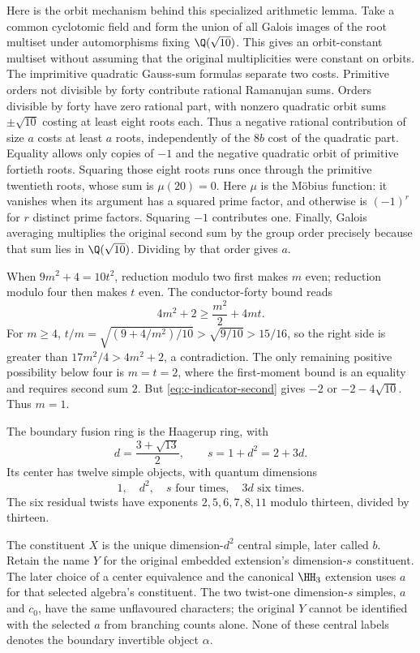 Here is the orbit mechanism behind this specialized arithmetic lemma.
Take a common cyclotomic field and form the union of all Galois images
of the root multiset under automorphisms fixing $\Q(\sqrt{10})$.
This gives an orbit-constant multiset without assuming that the
original multiplicities were constant on orbits. The imprimitive
quadratic Gauss-sum formulas separate two costs. Primitive orders
not divisible by forty contribute rational Ramanujan sums. Orders
divisible by forty have zero rational part, with nonzero quadratic
orbit sums $\pm\sqrt{10}$ costing at least eight roots each.
Thus a negative rational contribution of size $a$ costs at least
$a$ roots, independently of the $8b$ cost of the quadratic part.
Equality allows only copies of $-1$ and the negative quadratic orbit
of primitive fortieth roots. Squaring those eight roots runs once
through the primitive twentieth roots, whose sum is $\mu(20)=0$.
Here $\mu$ is the M\"obius function: it vanishes when its argument has
a squared prime factor, and otherwise is $(-1)^r$ for $r$ distinct
prime factors. Squaring $-1$ contributes one. Finally, Galois averaging
multiplies
the original second sum by the group order precisely because that
sum lies in $\Q(\sqrt{10})$. Dividing by that order gives $a$.

When $9m^2+4=10t^2$, reduction modulo two first makes $m$ even;
reduction modulo four then makes $t$ even. The conductor-forty
bound reads
\[
 4m^2+2\geq\frac{m^2}{2}+4mt.
\]
For $m\geq4$,
$t/m=\sqrt{(9+4/m^2)/10}>\sqrt{9/10}>15/16$, so the
right side is greater than $17m^2/4>4m^2+2$, a contradiction.
The only remaining positive possibility below four is $m=t=2$,
where the first-moment bound is an
equality and requires second sum $2$. But
\eqref{eq:c-indicator-second} gives $-2$ or $-2-4\sqrt{10}$.
Thus $m=1$.

\begin{proposition}
The boundary fusion ring is the Haagerup ring, with
\[
 d=\frac{3+\sqrt{13}}2,\qquad s=1+d^2=2+3d.
\]
Its center has twelve simple objects, with quantum dimensions
\[
 1,\quad d^2,\quad s\text{ four times},\quad3d\text{ six times}.
\]
The six residual twists have exponents
$2,5,6,7,8,11$ modulo thirteen, divided by thirteen.
\end{proposition}

The constituent $X$ is the unique dimension-$d^2$ central
simple, later called $b$. Retain the name $Y$ for the original
embedded extension's dimension-$s$ constituent. The later
choice of a center equivalence and the canonical $\HH_3$
extension uses $a$ for that selected algebra's constituent.
The two twist-one dimension-$s$ simples, $a$ and $c_0$, have
the same unflavoured characters; the original $Y$ cannot be
identified with the selected $a$ from branching counts alone.
None of these central labels denotes the boundary invertible
object $\alpha$.

